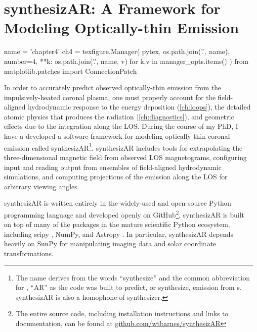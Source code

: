 \chapter{synthesizAR: A Framework for Modeling Optically-thin Emission}\label{ch:synthesizar}
\thispagestyle{firstpageofchapterstyle}

\begin{pycode}[chapter4]
name = 'chapter4'
ch4 = texfigure.Manager(
    pytex,
    os.path.join('.', name),
    number=4,
    **{k: os.path.join('.', name, v) for k,v in manager_opts.items()}
)
from matplotlib.patches import ConnectionPatch
\end{pycode}

In order to accurately predict observed optically-thin emission from the impulsively-heated coronal plasma, one must properly account for the field-aligned hydrodynamic response to the energy deposition (\autoref{ch:loops}), the detailed atomic physics that produces the radiation (\autoref{ch:diagnostics}), and geometric effects due to the integration along the LOS. During the course of my PhD, I have a developed a software framework for modeling optically-thin coronal emission called synthesizAR\footnote{The name derives from the words ``synthesize'' and the common abbreviation for \AR{}, ``AR'' as the code was built to predict, or synthesize, emission from \AR s. synthesizAR is also a homophone of synthesizer.}. synthesizAR includes tools for extrapolating the three-dimensional magnetic field from observed LOS magnetograms, configuring input and reading output from ensembles of field-aligned hydrodynamic simulations, and computing projections of the emission along the LOS for arbitrary viewing angles. 

synthesizAR is written entirely in the widely-used and open-source Python programming language and developed openly on GitHub\footnote{The entire source code, including installation instructions and links to documentation, can be found at \href{https://github.com/wtbarnes/synthesizAR}{github.com/wtbarnes/synthesizAR}}. synthesizAR is built on top of many of the packages in the mature scientific Python ecosystem, including scipy \citep{jones_scipy_2001}, NumPy\citep{oliphant_guide_2006}, and Astropy \citep{the_astropy_collaboration_astropy_2018}. In particular, synthesizAR depends heavily on SunPy \citep{sunpy_community_sunpypython_2015} for manipulating imaging data and solar coordinate transformations.


